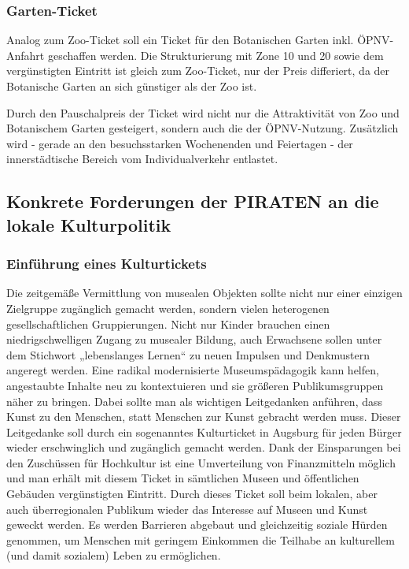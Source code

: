 \documentclass[a5paper, twoside, ngerman, 10pt]{scrbook}
\begin{document}
   \subsubsection{Garten-Ticket}
   
   Analog zum Zoo-Ticket soll ein Ticket für den Botanischen Garten inkl. 
   ÖPNV-Anfahrt geschaffen werden. Die Strukturierung mit Zone 10 und 20 sowie 
   dem vergünstigten Eintritt ist gleich zum Zoo-Ticket, nur der Preis 
   differiert, da der Botanische Garten an sich günstiger als der Zoo ist.
   
   Durch den Pauschalpreis der Ticket wird nicht nur die Attraktivität von Zoo 
   und Botanischem Garten gesteigert, sondern auch die der ÖPNV-Nutzung. 
   Zusätzlich wird - gerade an den besuchsstarken Wochenenden und Feiertagen - 
   der innerstädtische Bereich vom Individualverkehr entlastet.
   
   \subsection{Konkrete Forderungen der PIRATEN an die lokale Kulturpolitik}
   
   \subsubsection{Einführung eines Kulturtickets}
   
   Die zeitgemäße Vermittlung von musealen Objekten sollte nicht nur einer 
   einzigen Zielgruppe zugänglich gemacht werden, sondern vielen heterogenen 
   gesellschaftlichen Gruppierungen. Nicht nur Kinder brauchen einen 
   niedrigschwelligen Zugang zu musealer Bildung, auch Erwachsene sollen unter 
   dem Stichwort „lebenslanges Lernen“ zu neuen Impulsen und Denkmustern 
   angeregt werden. Eine radikal modernisierte Museumspädagogik kann helfen, 
   angestaubte Inhalte neu zu kontextuieren und sie größeren Publikumsgruppen 
   näher zu bringen. Dabei sollte man als wichtigen Leitgedanken anführen, 
   dass Kunst zu den Menschen, statt Menschen zur Kunst gebracht werden muss. 
   Dieser Leitgedanke soll durch ein sogenanntes Kulturticket in Augsburg für 
   jeden Bürger wieder erschwinglich und zugänglich gemacht werden. Dank der 
   Einsparungen bei den Zuschüssen für Hochkultur ist eine Umverteilung von 
   Finanzmitteln möglich und man erhält mit diesem Ticket in sämtlichen Museen 
   und öffentlichen Gebäuden vergünstigten Eintritt. Durch dieses Ticket soll 
   beim lokalen, aber auch überregionalen Publikum wieder das Interesse auf 
   Museen und Kunst geweckt werden. Es werden Barrieren abgebaut und 
   gleichzeitig soziale Hürden genommen, um Menschen mit geringem Einkommen 
   die Teilhabe an kulturellem (und damit sozialem) Leben zu ermöglichen.
   
\end{document}
